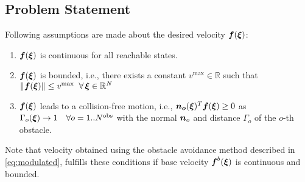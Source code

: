 \subsection{Problem Statement}
Following assumptions are made about the desired velocity $\boldsymbol{f}(\boldsymbol{\xi})$:
\begin{enumerate}
    \item $\boldsymbol{f}(\boldsymbol{\xi})$ is continuous for all reachable states.
    \item $\boldsymbol{f}(\boldsymbol{\xi})$ is bounded, i.e., there exists a constant $v^{\mathrm{max}} \in \mathbb{R}$ such that $\| \boldsymbol{f}(\boldsymbol{\xi}) \| \leq v^{\mathrm{max}} \;\; \forall \, \boldsymbol{\xi} \in \mathbb{R}^N$
    \item $\boldsymbol{f}(\boldsymbol{\xi})$ leads to a collision-free motion, i.e., $\boldsymbol{n_o}(\boldsymbol{\xi})^T \boldsymbol{f}(\boldsymbol{\xi}) \geq 0$ as $\Gamma_o(\boldsymbol{\xi}) \rightarrow 1 \quad \forall o = 1 .. N^{\mathrm{obs}}$ with the normal $\boldsymbol{n}_o$ and distance $\Gamma_o$ of the $o$-th obstacle. 
\end{enumerate}

Note that velocity obtained using the obstacle avoidance method described in \eqref{eq:modulated}, fulfills these conditions if base velocity $\boldsymbol{f}^b(\boldsymbol{\xi})$ is continuous and bounded.
